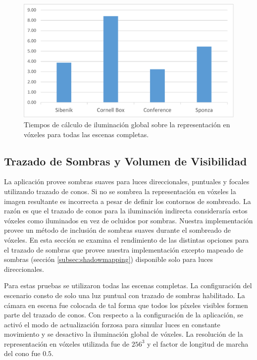 
\begin{figure}[h]
	\centering
	\includegraphics[width=0.95\linewidth]{media/voxel_gi_time_cropped.pdf}
	\caption{Tiempos de cálculo de iluminación global sobre la representación en vóxeles para todas las escenas completas.}
	\label{fig:gi_voxel_time}
\end{figure}

\subsection{Trazado de Sombras y Volumen de Visibilidad}

La aplicación provee sombras suaves para luces direccionales, puntuales y focales utilizando trazado de conos. Si no se sombrea la representación en vóxeles la imagen resultante es incorrecta a pesar de definir los contornos de sombreado. La razón es que el trazado de conos para la iluminación indirecta consideraría estos vóxeles como iluminados en vez de ocluidos por sombras. Nuestra implementación provee un método de inclusión de sombras suaves durante el sombreado de vóxeles. En esta sección se examina el rendimiento de las distintas opciones para el trazado de sombras que provee nuestra implementación excepto mapeado de sombras (sección \ref{subsec:shadowmapping}) disponible solo para luces direccionales.

Para estas pruebas se utilizaron todas las escenas completas. La configuración del escenario consto de solo una luz puntual con trazado de sombras habilitado. La cámara en escena fue colocada de tal forma que todos los píxeles visibles formen parte del trazado de conos. Con respecto a la configuración de la aplicación, se activó el modo de actualización forzosa para simular luces en constante movimiento y se desactivo la iluminación global de vóxeles. La resolución de la representación en vóxeles utilizada fue de $256^3$ y el factor de longitud de marcha del cono fue $0.5$.

